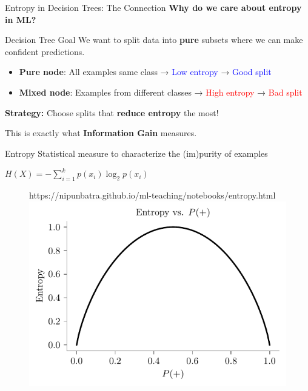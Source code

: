 \documentclass[usenames,dvipsnames]{beamer}
\begin{document}
\begin{frame}{Entropy in Decision Trees: The Connection}
\textbf{Why do we care about entropy in ML?}

\pause
\begin{examplebox}{Decision Tree Goal}
We want to split data into \textbf{pure} subsets where we can make confident predictions.
\end{examplebox}

\pause
\begin{itemize}
\item \textbf{Pure node}: All examples same class → \textcolor{blue}{Low entropy} → \textcolor{blue}{Good split}
\pause
\item \textbf{Mixed node}: Examples from different classes → \textcolor{red}{High entropy} → \textcolor{red}{Bad split}
\end{itemize}

\pause
\textbf{Strategy:} Choose splits that \textbf{reduce entropy} the most!

\pause
This is exactly what \textbf{Information Gain} measures.
\end{frame}

\begin{frame}{Entropy}
 Statistical measure to characterize the
(im)purity of examples

\pause $H(X) = -\sum_{i=1}^k p(x_i) \log_2 p(x_i)$

\begin{figure}[htp]
    \centering
    \begin{notebookbox}{https://nipunbatra.github.io/ml-teaching/notebooks/entropy.html}
      \includegraphics[scale=0.6]{../assets/decision-trees/figures/entropy.pdf}
    \end{notebookbox}
  \end{figure}

\end{frame}
	
\end{document}
